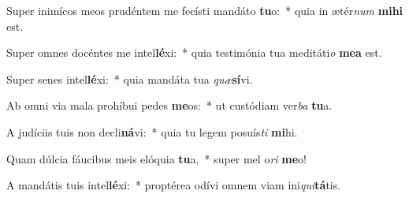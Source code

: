 \item Super inimícos meos prudéntem me fecísti mandáto \textbf{tu}o:~* quia in ætér\textit{num} \textbf{mi}\textbf{hi} est.
\item Super omnes docéntes me intel\textbf{lé}xi:~* quia testimónia tua meditáti\textit{o} \textbf{me}\textbf{a} est.
\item Super senes intel\textbf{lé}xi:~* quia mandáta tua \textit{quæ}\textbf{sí}vi.
\item Ab omni via mala prohíbui pedes \textbf{me}os:~* ut custódiam ver\textit{ba} \textbf{tu}a.
\item A judíciis tuis non decli\textbf{ná}vi:~* quia tu legem posuís\textit{ti} \textbf{mi}hi.
\item Quam dúlcia fáucibus meis elóquia \textbf{tu}a,~* super mel o\textit{ri} \textbf{me}o!
\item A mandátis tuis intel\textbf{lé}xi:~* proptérea odívi omnem viam ini\textit{qui}\textbf{tá}tis.
